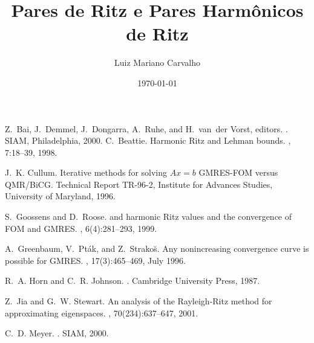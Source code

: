 \documentclass{article}
\title{Pares de Ritz e Pares Harmônicos de Ritz}
\author{ Luiz Mariano  Carvalho }
\date{\today
}
\begin{document}
	
\maketitle







\begin{thebibliography}{100}
	
	 Z.~Bai, J.~Demmel, J.~Dongarra, A.~Ruhe, and H.~van~der Vorst, editors.
	.
	\newblock SIAM, Philadelphia, 2000.
	 C.~Beattie. \newblock Harmonic {R}itz and {L}ehman bounds. ,
	7:18--39, 1998.

	 J.~K. Cullum. \newblock Iterative methods for solving ${A}x=b$ {GMRES-FOM} versus
	{QMR/BiCG}. \newblock Technical Report TR-96-2, Institute for Advances Studies, University
	of Maryland, 1996.
	
	
	 S.~Goossens and D.~Roose.  and harmonic {Ritz} values and the
	convergence of {FOM} and
	{GMRES}.
	, 6(4):281--293,
	1999.
	

	
	 A.~Greenbaum, V.~Pták, and Z.~Strako{\u{s}}. \newblock Any nonincreasing
	convergence curve is possible for {GMRES}. ,
	17(3):465--469, July 1996.
	

	

	

	

		
	 R.~A. Horn and C.~R. Johnson. . \newblock Cambridge
	University Press, 1987.
	


	
	 Z.~Jia and G.~W. Stewart. \newblock An analysis of the {Rayleigh-Ritz} method for
	approximating
	eigenspaces.
	, 70(234):637--647, 2001.
	

	

	
	 C.~D. Meyer. . \newblock SIAM,
	2000.
	

\end{thebibliography}
\end{document}
